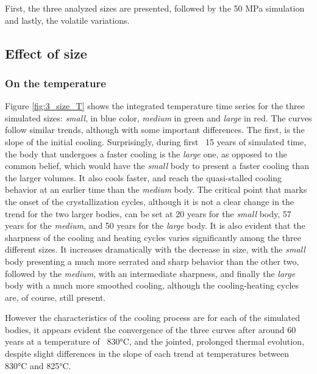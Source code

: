 First, the three analyzed sizes are presented, followed by the 50 MPa simulation and lastly, the volatile variations. 

\subsection{Effect of size}
\subsubsection{On the temperature}
Figure \ref{fig:3_size_T} shows the integrated temperature time series for the three simulated sizes: \textit{small}, in blue color, \textit{medium} in green and \textit{large} in red. The curves follow similar trends, although with some important differences. The first, is the slope of the initial cooling. Surprisingly, during first ~15 years of simulated time, the body that undergoes a faster cooling is the \textit{large} one, as opposed to the common belief, which would have the \textit{small} body to present a faster cooling than the larger volumes. It also cools faster, and reach the quasi-stalled cooling behavior at an earlier time than the \textit{medium} body. The critical point that marks the onset of the crystallization cycles, although it is not a clear change in the trend for the two larger bodies, can be set at 20 years for the \textit{small} body, 57 years for the \textit{medium}, and 50 years for the \textit{large} body. It is also evident that the sharpness of the cooling and heating cycles varies significantly among the three different sizes. It increases dramatically with the decrease in size, with the \textit{small} body presenting a much more serrated and sharp behavior than the other two, followed by the \textit{medium}, with an intermediate sharpness, and finally the \textit{large} body with a much more smoothed cooling, although the cooling-heating cycles are, of course, still present. 

However the characteristics of the cooling process are for each of the simulated bodies, it appears evident the convergence of the three curves after around 60 years at a temperature of ~830°C, and the jointed, prolonged thermal evolution, despite slight differences in the slope of each trend at temperatures between 830°C and 825°C. 

